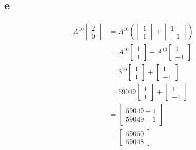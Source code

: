 \documentclass[10pt]{article}
\begin{document}
\subsection*{e}
\begin{align*}
    A^{10}
    \begin{bmatrix}
        2 \\
        0
    \end{bmatrix}
    &=
    A^{10}
    \left(
    \begin{bmatrix}
        1 \\
        1
    \end{bmatrix}
    +
    \begin{bmatrix}
        1 \\
        -1
    \end{bmatrix}
    \right) \\
    &=
    A^{10}
    \begin{bmatrix}
        1 \\
        1
    \end{bmatrix}
    +
    A^{10}
    \begin{bmatrix}
        1 \\
        -1
    \end{bmatrix} \\
    &=
    3^{10}
    \begin{bmatrix}
        1 \\
        1
    \end{bmatrix}
    +
    \begin{bmatrix}
        1 \\
        -1
    \end{bmatrix} \\
    &=
    59049
    \begin{bmatrix}
        1 \\
        1
    \end{bmatrix}
    +
    \begin{bmatrix}
        1 \\
        -1
    \end{bmatrix} \\
    &=
    \begin{bmatrix}
        59049 + 1 \\
        59049 - 1
    \end{bmatrix} \\
    &=
    \begin{bmatrix}
        59050 \\
        59048
    \end{bmatrix}
\end{align*}
\end{document}
